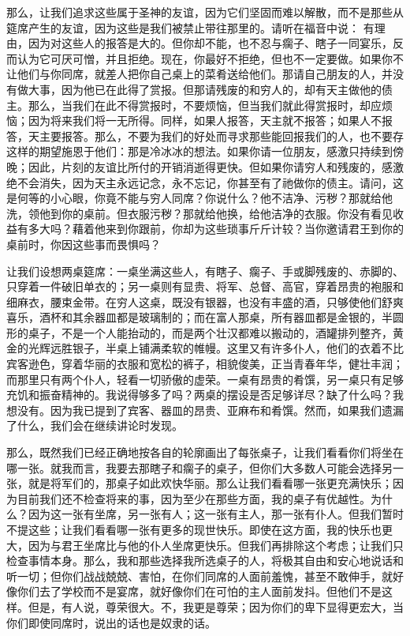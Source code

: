 那么，让我们追求这些属于圣神的友谊，因为它们坚固而难以解散，而不是那些从筵席产生的友谊，因为这些是我们被禁止带往那里的。请听在福音中说： 有理由，因为对这些人的报答是大的。但你却不能，也不忍与瘸子、瞎子一同宴乐，反而认为它可厌可憎，并且拒绝。现在，你最好不拒绝，但也不一定要做。如果你不让他们与你同席，就差人把你自己桌上的菜肴送给他们。那请自己朋友的人，并没有做大事，因为他已在此得了赏报。但那请残废的和穷人的，却有天主做他的债主。那么，当我们在此不得赏报时，不要烦恼，但当我们就此得赏报时，却应烦恼；因为将来我们将一无所得。同样，如果人报答，天主就不报答；如果人不报答，天主要报答。那么，不要为我们的好处而寻求那些能回报我们的人，也不要存这样的期望施恩于他们：那是冷冰冰的想法。如果你请一位朋友，感激只持续到傍晚；因此，片刻的友谊比所付的开销消逝得更快。但如果你请穷人和残废的，感激绝不会消失，因为天主永远记念，永不忘记，你甚至有了祂做你的债主。请问，这是何等的小心眼，你竟不能与穷人同席？你说什么？他不洁净、污秽？那就给他洗，领他到你的桌前。但衣服污秽？那就给他换，给他洁净的衣服。你没有看见收益有多大吗？藉着他来到你跟前，你却为这些琐事斤斤计较？当你邀请君王到你的桌前时，你因这些事而畏惧吗？\par

让我们设想两桌筵席：一桌坐满这些人，有瞎子、瘸子、手或脚残废的、赤脚的、只穿着一件破旧单衣的；另一桌则有显贵、将军、总督、高官，穿着昂贵的袍服和细麻衣，腰束金带。在穷人这桌，既没有银器，也没有丰盛的酒，只够使他们舒爽喜乐，酒杯和其余器皿都是玻璃制的；而在富人那桌，所有器皿都是金银的，半圆形的桌子，不是一个人能抬动的，而是两个壮汉都难以搬动的，酒罐排列整齐，黄金的光辉远胜银子，半桌上铺满柔软的帷幔。这里又有许多仆人，他们的衣着不比宾客逊色，穿着华丽的衣服和宽松的裤子，相貌俊美，正当青春年华，健壮丰润；而那里只有两个仆人，轻看一切骄傲的虚荣。一桌有昂贵的肴馔，另一桌只有足够充饥和振奋精神的。我说得够多了吗？两桌的摆设是否足够详尽？缺了什么吗？我想没有。因为我已提到了宾客、器皿的昂贵、亚麻布和肴馔。然而，如果我们遗漏了什么，我们会在继续讲论时发现。\par

那么，既然我们已经正确地按各自的轮廓画出了每张桌子，让我们看看你们将坐在哪一张。就我而言，我要去那瞎子和瘸子的桌子，但你们大多数人可能会选择另一张，就是将军们的，那桌子如此欢快华丽。那么让我们看看哪一张更充满快乐；因为目前我们还不检查将来的事，因为至少在那些方面，我的桌子有优越性。为什么？因为这一张有坐席，另一张有人；这一张有主人，那一张有仆人。但我们暂时不提这些；让我们看看哪一张有更多的现世快乐。即使在这方面，我的快乐也更大，因为与君王坐席比与他的仆人坐席更快乐。但我们再排除这个考虑；让我们只检查事情本身。那么，我和那些选择我所选桌子的人，将极其自由和安心地说话和听一切；但你们战战兢兢、害怕，在你们同席的人面前羞愧，甚至不敢伸手，就好像你们去了学校而不是宴席，就好像你们在可怕的主人面前发抖。但他们不是这样。但是，有人说，尊荣很大。不，我更是尊荣；因为你们的卑下显得更宏大，当你们即使同席时，说出的话也是奴隶的话。\par

